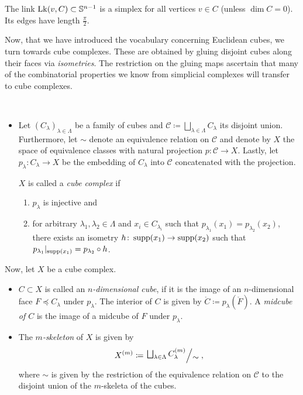 \begin{rem}
  The link \(\operatorname{Lk}(v,C) \subset \mathbb{S}^{n-1}\) is a simplex for all vertices \(v \in C\) (unless \(\dim C= 0\)). Its edges have length \(\frac{\pi}{2}\).
\end{rem}

Now, that we have introduced the vocabulary concerning Euclidean cubes, we turn towards cube complexes. These are obtained by gluing disjoint cubes along their faces via \emph{isometries}. The restriction on the gluing maps ascertain that many of the combinatorial properties we know from simplicial complexes will transfer to cube complexes.

\begin{defin}~\vspace{-6pt}
  \begin{itemize}
  \item Let \((C_\lambda)_{\lambda \in \Lambda}\) be a family of cubes and \(\mathcal{C} \coloneqq \bigsqcup_{\lambda \in \Lambda} C_\lambda\) its disjoint union. Furthermore, let \(\sim\) denote an equivalence relation on \(\mathcal{C}\) and denote by \(X\) the space of equivalence classes with natural projection \(p \colon \mathcal{C} \to X\). Lastly, let \(p_\lambda \colon C_\lambda \to X\) be the embedding of \(C_\lambda\) into \(\mathcal{C}\) concatenated with the projection.

    \(X\) is called a \emph{cube complex} if
    \begin{enumerate}
    \item \(p_\lambda\) is injective and
    \item for arbitrary \(\lambda_1, \lambda_2 \in \Lambda\) and \(x_i \in C_{\lambda_i}\) such that \(p_{\lambda_1}(x_1) = p_{\lambda_2}(x_2)\), there exists an isometry \(h\colon \operatorname{supp}(x_1) \to \operatorname{supp}(x_2)\) such that \(p_{\lambda_1}|_{\operatorname{supp}(x_1)} = p_{\lambda_2} \circ h\).
    \end{enumerate}
  \end{itemize}
  Now, let \(X\) be a cube complex.
  \begin{itemize}
  \item \(C \subset X\) is called an \emph{\(n\)-dimensional cube}, if it is the image of an \(n\)-dimensional face \(F \preceq C_\lambda\) under \(p_\lambda\). The interior of \(C\) is given by \(\mathring C \coloneqq p_\lambda(\mathring F)\). A \emph{midcube of \(C\)} is the image of a midcube of \(F\) under \(p_\lambda\).
  \item The \emph{\(m\)-skeleton} of \(X\) is given by
    \begin{align*}
      X^{(m)} \coloneqq \quot{\bigsqcup_{\lambda \in \Lambda} C_\lambda^{(m)}}{\sim},
    \end{align*}
    where \(\sim\) is given by the restriction of the equivalence relation on \(\mathcal{C}\) to the disjoint union of the \(m\)-skeleta of the cubes.


\end{itemize}
\end{defin}
